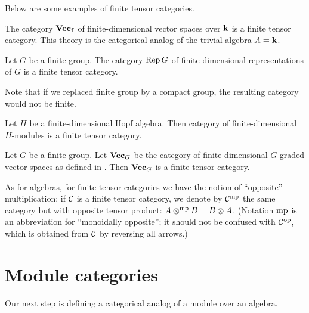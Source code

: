 Below are some examples of finite tensor categories.

\begin{example}\label{x:vecf-tensor}
  The category $\mathbf{Vec_f}$ of finite-dimensional vector spaces over $\mathbf{k}$ is a
  finite tensor category. This theory is the categorical analog of the trivial
  algebra $A=\mathbf{k}$.
\end{example}


\begin{example}\label{x:repg-tensor}
  Let $G$ be a finite group. The category $\operatorname{Rep} G$ of finite-dimensional
  representations of $G$ is a finite tensor category.
\end{example}
Note that if we replaced finite group by a compact group, the resulting category
would not be finite.

\begin{example}\label{x:hopf-tensor}
  Let $H$ be a finite-dimensional Hopf algebra. Then category of
  finite-dimensional $H$-modules is a finite tensor category.
\end{example}

\begin{example}\label{x:vectg-tensor}
  Let $G$ be a finite group. Let $\mathbf{Vec}_G$ be the category of finite-dimensional
  $G$-graded vector spaces as defined in .
  Then $\mathbf{Vec}_G$ is a finite tensor category.
\end{example}

As for algebras, for finite tensor categories we have the notion of ``opposite''
multiplication: if $\mathcal{C}$ is a finite tensor category, we denote by
$\mathcal{C}^{\mathrm{mp}}$ the same category but with opposite tensor product:
$A\otimes^{{\mathrm{mp}}} B=B \otimes A$. (Notation ${\mathrm{mp}}$ is an abbreviation for
``monoidally opposite''; it should not be confused with $\mathcal{C}^{\mathrm{op}}$, which is
obtained from $\mathcal{C}$ by reversing all arrows.)


\section{Module categories}\label{s:module-categories}
Our next step is defining a categorical analog of a module over an algebra.

